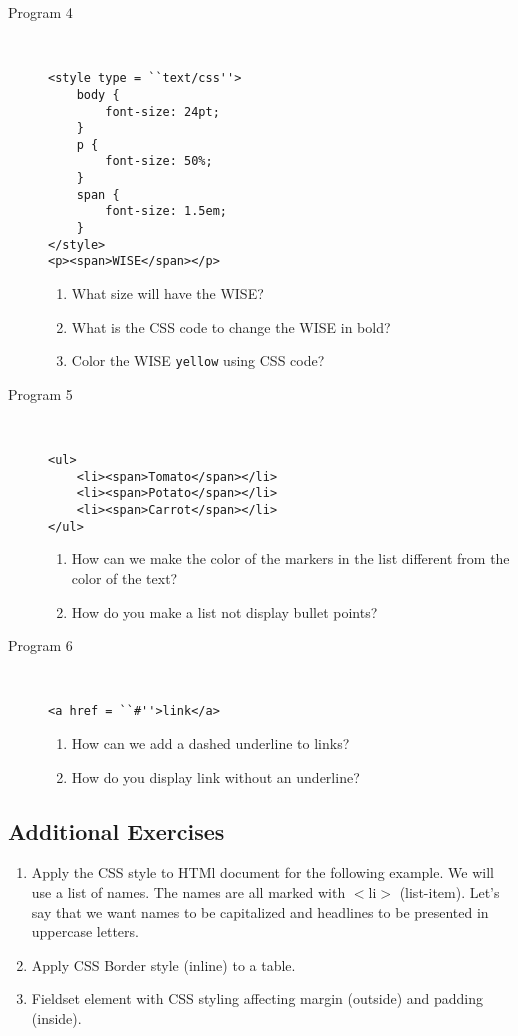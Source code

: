 \documentclass[11pt,a4paper]{article}
\def\AnswerBox{\fbox{\begin{minipage}{4in}\hfill\vspace{0.5in}\end{minipage}}}
\begin{document}
\begin{description}
\item [Program 4]\ 
\begin{lstlisting}
<style type = ``text/css''>
    body {
        font-size: 24pt;
    }
    p {
        font-size: 50%;
    }
    span {
        font-size: 1.5em;
    }
</style>
<p><span>WISE</span></p>
\end{lstlisting}
\AnswerBox
\begin{enumerate}[label=\bfseries Q\arabic*:]\itemsep10pt
\item What size will have the WISE?
\item What is the CSS code to change the WISE in bold?
\item Color the WISE \texttt{yellow} using CSS code?
\end{enumerate}

\item [Program 5]\
\begin{lstlisting}
<ul>
    <li><span>Tomato</span></li>
    <li><span>Potato</span></li>
    <li><span>Carrot</span></li>
</ul>
\end{lstlisting}
\AnswerBox
\begin{enumerate}[label=\bfseries Q\arabic*:]\itemsep10pt
\item How can we make the color of the markers in the list different from the color of the text?
\item How do you make a list not display bullet points?
\end{enumerate}


\item [Program 6]\
\begin{lstlisting}
<a href = ``#''>link</a>
\end{lstlisting}
\AnswerBox
\begin{enumerate}[label=\bfseries Q\arabic*:]\itemsep10pt
\item How can we add a dashed underline to links?
\item How do you display link without an underline?
\end{enumerate}


\end{description}
\subsection*{Additional Exercises}
\begin{enumerate}
\item Apply the CSS style to HTMl document for the following example. We will use a list of names. The names are all marked with $<$li$>$ (list-item). Let's say that we want names to be capitalized and headlines to be presented in uppercase letters.
\item Apply CSS Border style (inline) to a table.
\item Fieldset element with CSS styling affecting margin (outside) and padding (inside).
\end{enumerate}
\end{document}
